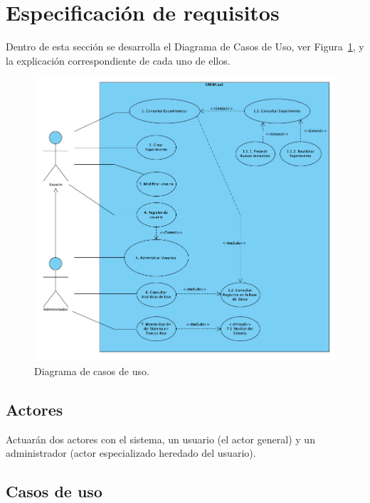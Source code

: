 \section{Especificación de requisitos}

Dentro de esta sección se desarrolla el Diagrama de Casos de Uso, ver Figura~\ref{img:diagrama-casos-uso}, y la explicación correspondiente de cada uno de ellos.

\begin{figure}[h!]
	\centering
	\includegraphics[scale=0.5]{../img/anexos/requisitos/casos_de_uso}
	\caption{Diagrama de casos de uso.}\label{img:diagrama-casos-uso}
\end{figure}

\subsection{Actores}
Actuarán dos actores con el sistema, un usuario (el actor general) y un administrador (actor especializado heredado del usuario).

\subsection{Casos de uso}\label{casos-de-uso}

